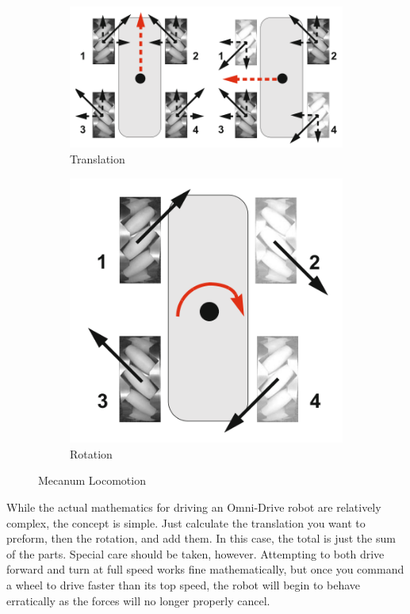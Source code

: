 \begin{figure}
\centering
\begin{subfigure}{.5\textwidth}
  \centering
\includegraphics[width=\textwidth]{swedish_vector2.png}
  \caption{Translation}
  \label{fig:sub1}
\end{subfigure}%
\begin{subfigure}{.5\textwidth}
  \centering
\includegraphics[width=.5\textwidth]{swedish_vector3.png}
  \caption{Rotation}
  \label{fig:sub2}
\end{subfigure}
\caption{Mecanum Locomotion}
\label{fig:mecanumlocomotion}
\end{figure}

While the actual mathematics for driving an Omni-Drive robot are relatively complex, the concept is simple. Just calculate the translation you want to preform, then the rotation, and add them. In this case, the total is just the sum of the parts. Special care should be taken, however. Attempting to both drive forward and turn at full speed works fine mathematically, but once you command a wheel to drive faster than its top speed, the robot will begin to behave erratically as the forces will no longer properly cancel.



























